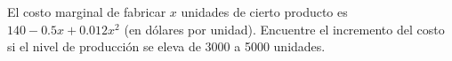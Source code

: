 \item El costo marginal de fabricar $x$ unidades de cierto producto es $140 - 0.5x + 0.012x^2$ (en dólares por unidad). Encuentre el incremento del costo si el nivel de producción se eleva de 3000 a 5000 unidades.
